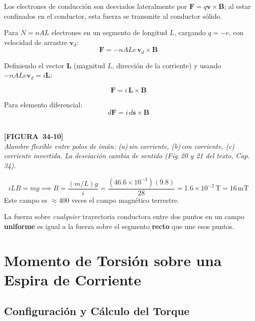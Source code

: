 \documentclass[12pt, letterpaper]{report}
\numberwithin{equation}{section}
\newcommand{\vB}[1]{\boldsymbol{#1}}          %
\newcommand{\un}[1]{\,\mathrm{#1}}            %
\newcommand{\figplaceholder}[2]{%
  \begin{tcolorbox}[figbox]
    \centering
    \textcolor{NavyBlue!50}{\rule{0pt}{2.8cm}}\\[4pt]
    {\small\color{NavyBlue}\textbf{[FIGURA\ #1]}\\[2pt]
    \textit{#2}}
  \end{tcolorbox}
}
\begin{document}
Los electrones de conducción son desviados lateralmente por
$\vB{F}=q\vB{v}\times\vB{B}$; al estar confinados en el conductor,
esta fuerza se transmite al conductor sólido.

Para $N=nAL$ electrones en un segmento de longitud $L$,
cargando $q=-e$, con velocidad de arrastre $\vB{v}_d$:
\[
  \vB{F} = -nALe\,\vB{v}_d\times\vB{B}
\]

Definiendo el vector $\vB{L}$ (magnitud $L$, dirección de la corriente)
y usando $-nALe\vB{v}_d=i\vB{L}$:

\begin{equation}
  \boxed{\vB{F} = i\,\vB{L}\times\vB{B}}
  \label{eq:Fcorriente}
\end{equation}

Para elemento diferencial:
\begin{equation}
  d\vB{F} = i\,d\vB{s}\times\vB{B}
  \label{eq:dFcorriente}
\end{equation}

\figplaceholder{34-10}{Alambre flexible entre polos de imán: (a)\,sin corriente,
(b)\,con corriente, (c)\,corriente invertida. La desviación cambia de
sentido (Fig.\,20 y 21 del texto, Cap.\,34).}

\begin{tcolorbox}[exbox,
  title=Ejemplo — Alambre en equilibrio ($m/L=46.6\un{g/m}$,
  $i=28\un{A}$)]
  \[
    iLB = mg \implies B = \frac{(m/L)g}{i}
            = \frac{(46.6\times10^{-3})(9.8)}{28}
            = 1.6\times10^{-2}\un{T} = 16\un{mT}
  \]
  Este campo es $\approx400$ veces el campo magnético terrestre.
\end{tcolorbox}

\begin{tcolorbox}[propbox, title=Resultado notable — Trayectorias en campo uniforme]
  La fuerza sobre \textit{cualquier} trayectoria conductora entre dos puntos
  en un campo \textbf{uniforme} es igual a la fuerza sobre el segmento
  \textbf{recto} que une esos puntos.
\end{tcolorbox}

\section{Momento de Torsión sobre una Espira de Corriente}

\subsection{Configuración y Cálculo del Torque}
\end{document}
